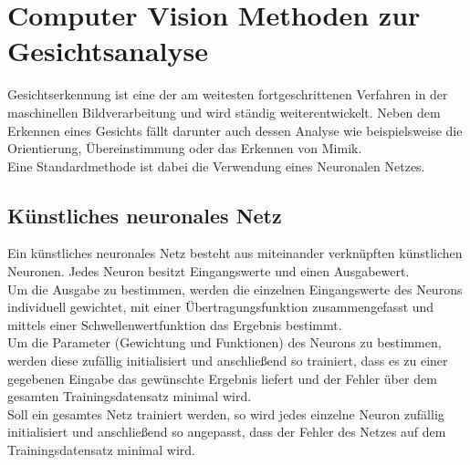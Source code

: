 \section{Computer Vision Methoden zur Gesichtsanalyse}
Gesichtserkennung ist eine der am weitesten fortgeschrittenen Verfahren in der maschinellen Bildverarbeitung und wird ständig weiterentwickelt. Neben dem Erkennen eines Gesichts fällt darunter auch dessen Analyse wie beispielsweise die Orientierung, Übereinstimmung oder das Erkennen von Mimik.\\
Eine Standardmethode ist dabei die Verwendung eines Neuronalen Netzes.
\subsection{Künstliches neuronales Netz}
Ein künstliches neuronales Netz besteht aus miteinander verknüpften künstlichen Neuronen. Jedes Neuron besitzt Eingangswerte und einen Ausgabewert.\\
Um die Ausgabe zu bestimmen, werden die einzelnen Eingangswerte des Neurons individuell gewichtet, mit einer Übertragungsfunktion zusammengefasst und mittels einer Schwellenwertfunktion das Ergebnis bestimmt.\\
Um die Parameter (Gewichtung und Funktionen) des Neurons zu bestimmen, werden diese zufällig initialisiert und anschließend so trainiert, dass es zu einer gegebenen Eingabe das gewünschte Ergebnis liefert und der Fehler über dem gesamten Trainingsdatensatz minimal wird.\\
Soll ein gesamtes Netz trainiert werden, so wird jedes einzelne Neuron zufällig initialisiert und anschließend so angepasst, dass der Fehler des Netzes auf dem Trainingsdatensatz minimal wird.
\cite{Maschin_Neuron}
